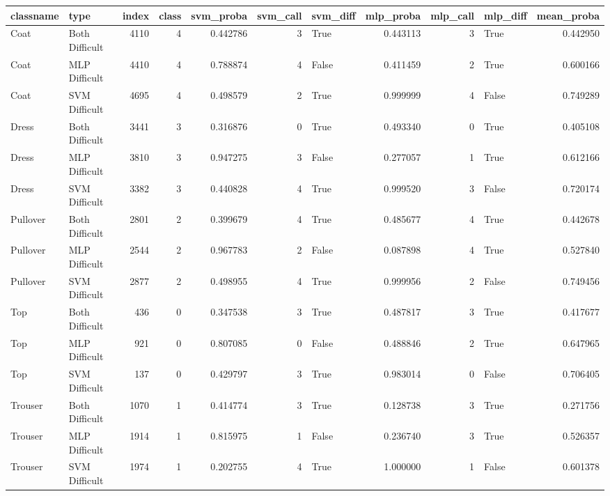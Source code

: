 \begin{tabular}{llrrrrlrrlr}
\toprule
classname &           type &  index &  class &  svm\_proba &  svm\_call &  svm\_diff &  mlp\_proba &  mlp\_call &  mlp\_diff &  mean\_proba \\
\midrule
     Coat & Both Difficult &   4110 &      4 &   0.442786 &         3 &      True &   0.443113 &         3 &      True &    0.442950 \\
     Coat &  MLP Difficult &   4410 &      4 &   0.788874 &         4 &     False &   0.411459 &         2 &      True &    0.600166 \\
     Coat &  SVM Difficult &   4695 &      4 &   0.498579 &         2 &      True &   0.999999 &         4 &     False &    0.749289 \\
    Dress & Both Difficult &   3441 &      3 &   0.316876 &         0 &      True &   0.493340 &         0 &      True &    0.405108 \\
    Dress &  MLP Difficult &   3810 &      3 &   0.947275 &         3 &     False &   0.277057 &         1 &      True &    0.612166 \\
    Dress &  SVM Difficult &   3382 &      3 &   0.440828 &         4 &      True &   0.999520 &         3 &     False &    0.720174 \\
 Pullover & Both Difficult &   2801 &      2 &   0.399679 &         4 &      True &   0.485677 &         4 &      True &    0.442678 \\
 Pullover &  MLP Difficult &   2544 &      2 &   0.967783 &         2 &     False &   0.087898 &         4 &      True &    0.527840 \\
 Pullover &  SVM Difficult &   2877 &      2 &   0.498955 &         4 &      True &   0.999956 &         2 &     False &    0.749456 \\
      Top & Both Difficult &    436 &      0 &   0.347538 &         3 &      True &   0.487817 &         3 &      True &    0.417677 \\
      Top &  MLP Difficult &    921 &      0 &   0.807085 &         0 &     False &   0.488846 &         2 &      True &    0.647965 \\
      Top &  SVM Difficult &    137 &      0 &   0.429797 &         3 &      True &   0.983014 &         0 &     False &    0.706405 \\
  Trouser & Both Difficult &   1070 &      1 &   0.414774 &         3 &      True &   0.128738 &         3 &      True &    0.271756 \\
  Trouser &  MLP Difficult &   1914 &      1 &   0.815975 &         1 &     False &   0.236740 &         3 &      True &    0.526357 \\
  Trouser &  SVM Difficult &   1974 &      1 &   0.202755 &         4 &      True &   1.000000 &         1 &     False &    0.601378 \\
\bottomrule
\end{tabular}
